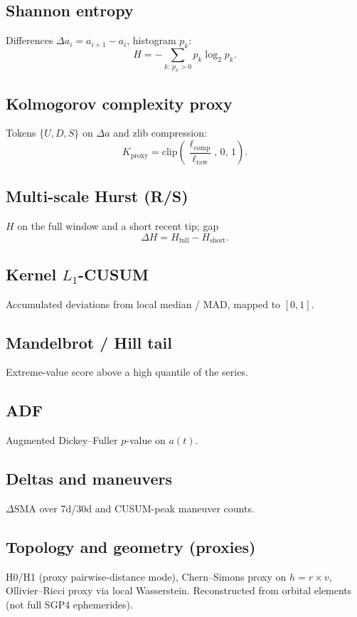 \documentclass[11pt,a4paper]{article}
\begin{document}
\subsection{Shannon entropy}
Differences \(\Delta a_i = a_{i+1}-a_i\), histogram \(p_k\):
\begin{equation}
  H = -\sum_{k:\,p_k>0} p_k \log_2 p_k .
\end{equation}

\subsection{Kolmogorov complexity proxy}
Tokens \(\{U,D,S\}\) on \(\Delta a\) and zlib compression:
\begin{equation}
  K_{\mathrm{proxy}} = \mathrm{clip}\!\left(\frac{\ell_{\mathrm{comp}}}{\ell_{\mathrm{raw}}},\,0,\,1\right).
\end{equation}

\subsection{Multi-scale Hurst (R/S)}
\(H\) on the full window and a short recent tip; gap
\begin{equation}
  \Delta H = H_{\mathrm{full}} - H_{\mathrm{short}}.
\end{equation}

\subsection{Kernel \(L_1\)-CUSUM}
Accumulated deviations from local median / MAD, mapped to \([0,1]\).

\subsection{Mandelbrot / Hill tail}
Extreme-value score above a high quantile of the series.

\subsection{ADF}
Augmented Dickey--Fuller \(p\)-value on \(a(t)\).

\subsection{Deltas and maneuvers}
\(\Delta\)SMA over 7d/30d and CUSUM-peak maneuver counts.

\subsection{Topology and geometry (proxies)}
H0/H1 (proxy pairwise-distance mode), Chern--Simons proxy on \(h=r\times v\), Ollivier--Ricci proxy via local Wasserstein.
Reconstructed from orbital elements (not full SGP4 ephemerides).
\end{document}
